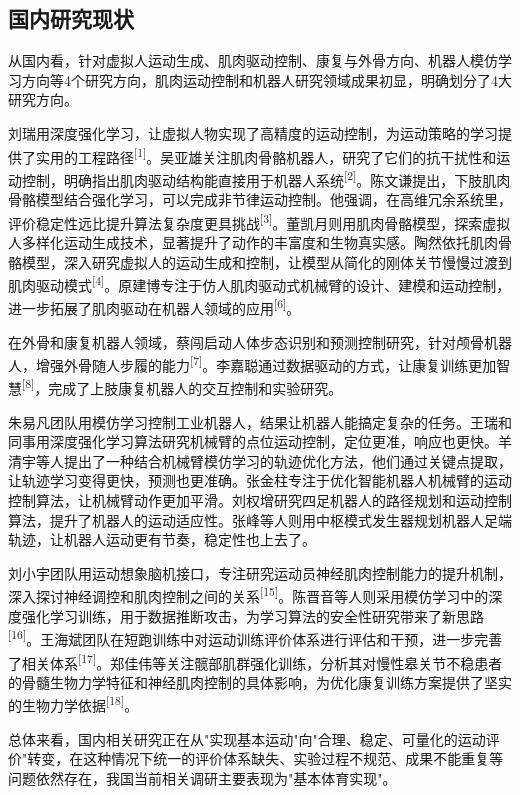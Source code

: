 \subsection{国内研究现状}


从国内看，针对虚拟人运动生成、肌肉驱动控制、康复与外骨方向、机器人模仿学习方向等4个研究方向，肌肉运动控制和机器人研究领域成果初显，明确划分了4大研究方向。

刘瑞用深度强化学习，让虚拟人物实现了高精度的运动控制，为运动策略的学习提供了实用的工程路径\textsuperscript{[1]}。吴亚雄关注肌肉骨骼机器人，研究了它们的抗干扰性和运动控制，明确指出肌肉驱动结构能直接用于机器人系统\textsuperscript{[2]}。陈文谦提出，下肢肌肉骨骼模型结合强化学习，可以完成非节律运动控制。他强调，在高维冗余系统里，评价稳定性远比提升算法复杂度更具挑战\textsuperscript{[3]}。董凯月则用肌肉骨骼模型，探索虚拟人多样化运动生成技术，显著提升了动作的丰富度和生物真实感。陶然依托肌肉骨骼模型，深入研究虚拟人的运动生成和控制，让模型从简化的刚体关节慢慢过渡到肌肉驱动模式\textsuperscript{[4]}。原建博专注于仿人肌肉驱动式机械臂的设计、建模和运动控制，进一步拓展了肌肉驱动在机器人领域的应用\textsuperscript{[6]}。

在外骨和康复机器人领域，蔡闯启动人体步态识别和预测控制研究，针对颅骨机器人，增强外骨随人步履的能力\textsuperscript{[7]}。李嘉聪通过数据驱动的方式，让康复训练更加智慧\textsuperscript{[8]}，完成了上肢康复机器人的交互控制和实验研究。

朱易凡团队用模仿学习控制工业机器人，结果让机器人能搞定复杂的任务。王瑞和同事用深度强化学习算法研究机械臂的点位运动控制，定位更准，响应也更快。羊清宇等人提出了一种结合机械臂模仿学习的轨迹优化方法，他们通过关键点提取，让轨迹学习变得更快，预测也更准确。张金柱专注于优化智能机器人机械臂的运动控制算法，让机械臂动作更加平滑。刘权增研究四足机器人的路径规划和运动控制算法，提升了机器人的运动适应性。张峰等人则用中枢模式发生器规划机器人足端轨迹，让机器人运动更有节奏，稳定性也上去了。

刘小宇团队用运动想象脑机接口，专注研究运动员神经肌肉控制能力的提升机制，深入探讨神经调控和肌肉控制之间的关系\textsuperscript{[15]}。陈晋音等人则采用模仿学习中的深度强化学习训练，用于数据推断攻击，为学习算法的安全性研究带来了新思路\textsuperscript{[16]}。王海斌团队在短跑训练中对运动训练评价体系进行评估和干预，进一步完善了相关体系\textsuperscript{[17]}。郑佳伟等关注髋部肌群强化训练，分析其对慢性皋关节不稳患者的骨髓生物力学特征和神经肌肉控制的具体影响，为优化康复训练方案提供了坚实的生物力学依据\textsuperscript{[18]}。

总体来看，国内相关研究正在从"实现基本运动"向"合理、稳定、可量化的运动评价"转变，在这种情况下统一的评价体系缺失、实验过程不规范、成果不能重复等问题依然存在，我国当前相关调研主要表现为"基本体育实现"。

